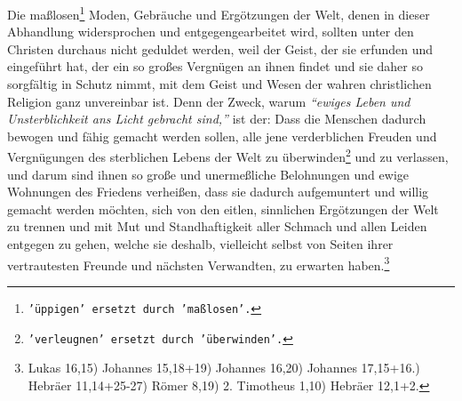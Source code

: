 Die maßlosen\footnote{\texttt{'üppigen' ersetzt durch 'maßlosen'.}}
Moden, Gebräuche und Ergötzungen der Welt, denen in dieser
Abhandlung widersprochen und entgegengearbeitet wird, sollten unter den Christen
durchaus nicht geduldet werden, weil der Geist, der sie erfunden und eingeführt
hat, der ein so großes Vergnügen an ihnen findet und sie daher so sorgfältig in
Schutz nimmt, mit dem Geist und Wesen der wahren christlichen Religion ganz
unvereinbar ist. Denn der Zweck, warum
\textit{"`ewiges Leben und Unsterblichkeit ans
Licht gebracht sind,"'} ist der: Dass die Menschen dadurch bewogen und fähig
gemacht werden sollen, alle jene verderblichen Freuden und Vergnügungen des
sterblichen Lebens der Welt zu überwinden\footnote{\texttt{'verleugnen' ersetzt
durch 'überwinden'.}}
und zu verlassen, und darum sind ihnen
so große und unermeßliche Belohnungen und ewige
Wohnungen des Friedens
verheißen, dass sie dadurch aufgemuntert und willig gemacht werden möchten, sich
von den eitlen, sinnlichen Ergötzungen der Welt zu trennen und mit Mut und
Standhaftigkeit aller Schmach und allen Leiden
entgegen zu gehen, welche sie
deshalb, vielleicht selbst von Seiten ihrer vertrautesten Freunde und nächsten
Verwandten, zu erwarten haben.\footnote{
Lukas 16,15)
Johannes 15,18+19)
Johannes 16,20)
Johannes 17,15+16.)
Hebräer 11,14+25-27)
Römer 8,19)
2. Timotheus 1,10)
Hebräer 12,1+2. }


\medskip

